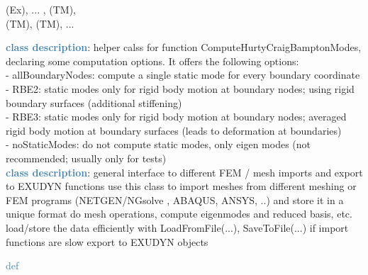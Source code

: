 \begin{itemize}[leftmargin=1.4cm]
\begin{itemize}[leftmargin=1.4cm]
\begin{itemize}[leftmargin=0.5cm]
\begin{itemize}[leftmargin=1.4cm]
\begin{itemize}[leftmargin=1.4cm]
\begin{itemize}[leftmargin=0.5cm]
 (Ex), 
 ...
, 
 (TM), 
\\  (TM), 
 (TM), 
 ...

\ei

%
\noindent\textcolor{steelblue}{{\bf class description}}:  helper calss for function ComputeHurtyCraigBamptonModes, declaring some computation options. It offers the following options:\\
 - allBoundaryNodes:     compute a single static mode for every boundary coordinate\\
 - RBE2:                 static modes only for rigid body motion at boundary nodes; using rigid boundary surfaces (additional stiffening)\\
 - RBE3:                 static modes only for rigid body motion at boundary nodes; averaged rigid body motion at boundary surfaces (leads to deformation at boundaries)\\
 - noStaticModes:        do not compute static modes, only eigen modes (not recommended; usually only for tests)
\vspace{3pt} \\ 
\noindent\textcolor{steelblue}{{\bf class description}}:  general interface to different FEM / mesh imports and export to EXUDYN functions
         use this class to import meshes from different meshing or FEM programs (NETGEN/NGsolve \cite{NGsolve2022}, ABAQUS, ANSYS, ..) and store it in a unique format
         do mesh operations, compute eigenmodes and reduced basis, etc.
         load/store the data efficiently with LoadFromFile(...), SaveToFile(...)  if import functions are slow
         export to EXUDYN objects
\vspace{3pt} \\ 
\begin{flushleft}
\noindent \textcolor{steelblue}{def {\bf {}}}\label{sec:FEM:FEMinterface:__init__}

\end{flushleft}
\end{itemize}
\end{itemize}
\end{itemize}
\end{itemize}
\end{itemize}
\end{itemize}
